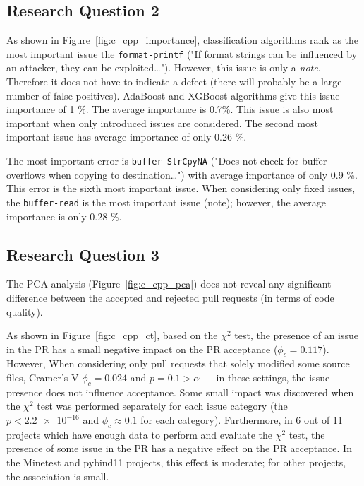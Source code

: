 \documentclass[digital,oneside,oldtable,nolof,nolot,nocover]{fithesis4}
\begin{document}
\subsection{Research Question 2}
\label{sec:org911f46c}
As shown in Figure~\ref{fig:c_cpp_importance},
classification algorithms rank as the most important issue the
\texttt{format-printf} ("If format strings can be influenced by an attacker, they
can be exploited\dots{}"). However, this issue is only a \emph{note}.  Therefore it
does not have to indicate a defect (there will probably be a large number of
false positives). AdaBoost and XGBoost algorithms give this issue importance
of 1 \%. The average importance is 0.7\%.  This issue is also most important
when only introduced issues are considered. The second most important issue has
average importance of only 0.26 \%.

The most important error is \texttt{buffer-StrCpyNA} ("Does not check for buffer
overflows when copying to destination\dots{}") with average importance of only
0.9 \%. This error is the sixth most important issue.
When considering only fixed issues, the \texttt{buffer-read} is the most important issue (note);
however, the average importance is only 0.28 \%.
\subsection{Research Question 3}
\label{sec:org57231ee}
The PCA analysis (Figure~\ref{fig:c_cpp_pca})
does not reveal any significant difference between the accepted
and rejected pull requests (in terms of code quality).

As shown in Figure~\ref{fig:c_cpp_ct}, based on the \(\chi^2\) test,
the presence of an issue in the PR has a small negative impact
on the PR acceptance (\(\phi_c = 0.117\)).
However, When considering only pull requests that solely modified some source files,
Cramer's V \(\phi_c = 0.024\) and \(p = 0.1 > \alpha\) --- in these settings, the issue presence
does not influence acceptance.
Some small impact was discovered when the \(\chi^2\) test was performed separately for
each issue category (the \(p < \num{2.2e-16}\) and \(\phi_c \approx 0.1\) for each category).
Furthermore, in 6 out of 11 projects which have enough data to perform and evaluate the \(\chi^2\) test,
the presence of some issue in the PR has a negative effect on the PR acceptance.
In the Minetest and pybind11 projects, this effect is moderate;
for other projects, the association is small.
\end{document}
